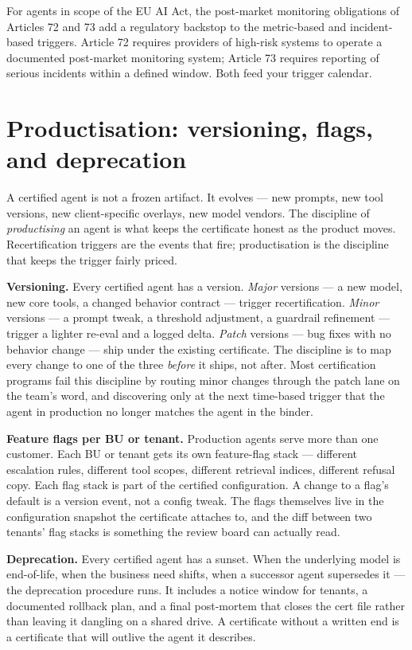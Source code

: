 For agents in scope of the EU AI Act, the post-market monitoring obligations of Articles 72 and 73 add a regulatory backstop to the metric-based and incident-based triggers. Article 72 requires providers of high-risk systems to operate a documented post-market monitoring system; Article 73 requires reporting of serious incidents within a defined window. Both feed your trigger calendar.

\section{Productisation: versioning, flags, and deprecation}

A certified agent is not a frozen artifact. It evolves --- new prompts, new tool versions, new client-specific overlays, new model vendors. The discipline of \textit{productising} an agent is what keeps the certificate honest as the product moves. Recertification triggers are the events that fire; productisation is the discipline that keeps the trigger fairly priced.

\textbf{Versioning.} Every certified agent has a version. \textit{Major} versions --- a new model, new core tools, a changed behavior contract --- trigger recertification. \textit{Minor} versions --- a prompt tweak, a threshold adjustment, a guardrail refinement --- trigger a lighter re-eval and a logged delta. \textit{Patch} versions --- bug fixes with no behavior change --- ship under the existing certificate. The discipline is to map every change to one of the three \textit{before} it ships, not after. Most certification programs fail this discipline by routing minor changes through the patch lane on the team's word, and discovering only at the next time-based trigger that the agent in production no longer matches the agent in the binder.

\textbf{Feature flags per BU or tenant.} Production agents serve more than one customer. Each BU or tenant gets its own feature-flag stack --- different escalation rules, different tool scopes, different retrieval indices, different refusal copy. Each flag stack is part of the certified configuration. A change to a flag's default is a version event, not a config tweak. The flags themselves live in the configuration snapshot the certificate attaches to, and the diff between two tenants' flag stacks is something the review board can actually read.

\textbf{Deprecation.} Every certified agent has a sunset. When the underlying model is end-of-life, when the business need shifts, when a successor agent supersedes it --- the deprecation procedure runs. It includes a notice window for tenants, a documented rollback plan, and a final post-mortem that closes the cert file rather than leaving it dangling on a shared drive. A certificate without a written end is a certificate that will outlive the agent it describes.


